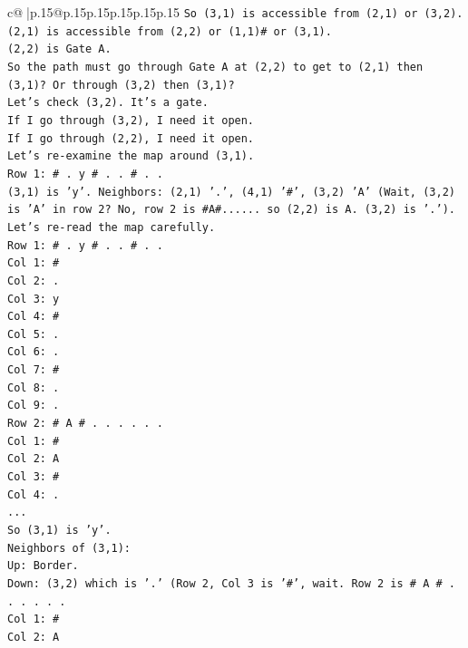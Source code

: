 \documentclass{article}
\begin{document}
{\begin{supertabular}{c@{$\;$}|p{.15\linewidth}@{}p{.15\linewidth}p{.15\linewidth}p{.15\linewidth}p{.15\linewidth}p{.15\linewidth}}
{{{\texttt{So (3,1) is accessible from (2,1) or (3,2).} \\
\texttt{(2,1) is accessible from (2,2) or (1,1)\# or (3,1).} \\
\texttt{(2,2) is Gate A.} \\
\texttt{So the path must go through Gate A at (2,2) to get to (2,1) then (3,1)? Or through (3,2) then (3,1)?} \\
\texttt{Let's check (3,2). It's a gate.} \\
\texttt{If I go through (3,2), I need it open.} \\
\texttt{If I go through (2,2), I need it open.} \\
\texttt{Let's re{-}examine the map around (3,1).} \\
\texttt{Row 1: \# . y \# . . \# . .} \\
\texttt{(3,1) is 'y'. Neighbors: (2,1) '.', (4,1) '\#', (3,2) 'A' (Wait, (3,2) is 'A' in row 2? No, row 2 is \#A\#...... so (2,2) is A. (3,2) is '.').} \\
\texttt{Let's re{-}read the map carefully.} \\
\texttt{Row 1: \# . y \# . . \# . .} \\
\texttt{Col 1: \#} \\
\texttt{Col 2: .} \\
\texttt{Col 3: y} \\
\texttt{Col 4: \#} \\
\texttt{Col 5: .} \\
\texttt{Col 6: .} \\
\texttt{Col 7: \#} \\
\texttt{Col 8: .} \\
\texttt{Col 9: .} \\
\texttt{Row 2: \# A \# . . . . . .} \\
\texttt{Col 1: \#} \\
\texttt{Col 2: A} \\
\texttt{Col 3: \#} \\
\texttt{Col 4: .} \\
\texttt{...} \\
\texttt{So (3,1) is 'y'.} \\
\texttt{Neighbors of (3,1):} \\
\texttt{Up: Border.} \\
\texttt{Down: (3,2) which is '.' (Row 2, Col 3 is '\#', wait. Row 2 is \# A \# . . . . . .} \\
\texttt{Col 1: \#} \\
\texttt{Col 2: A} \\
}}}
\end{supertabular}}
\end{document}
